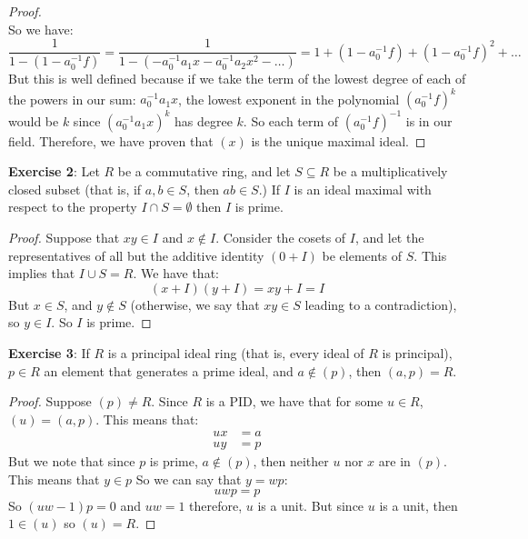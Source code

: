\documentclass{article}
\begin{document}
\begin{proof}
\begin{equation*}
            \end{equation*}
        So we have:
            \begin{equation*}
                \dfrac{1}{1 - (1 - a_{0}^{-1}f)} = \dfrac{1}{1 - (-a_{0}^{-1}a_{1}x - a_{0}^{-1}a_{2}x^{2} - \ldots)} = 1 + (1 - a_{0}^{-1}f) + (1 - a_{0}^{-1}f)^{2} + \ldots
            \end{equation*}
        But this is well defined because if we take the term of the lowest degree of each of the powers in our sum: $a_{0}^{-1}a_{1}x$, the lowest exponent in the polynomial $(a_{0}^{-1}f)^{k}$ would be $k$ since $(a_{0}^{-1}a_{1}x)^{k}$ has degree $k$. So each term of $(a_{0}^{-1}f)^{-1}$ is in our field. Therefore, we have proven that $(x)$ is the unique maximal ideal.
    \end{proof}

\textbf{Exercise 2}: Let $R$ be a commutative ring, and let $S \subseteq R$ be a multiplicatively closed subset (that is, if $a, b \in S$, then $ab \in S$.) If $I$ is an ideal maximal with respect to the property $I \cap S = \emptyset$ then $I$ is prime.
    \begin{proof}
        Suppose that $xy \in I$ and $x \notin I$. Consider the cosets of $I$, and let the representatives of all but the additive identity $(0 + I)$ be elements of $S$. This implies that $I \cup S = R$. We have that:
            \begin{equation*}
                (x + I)(y + I) = xy + I = I
            \end{equation*}
        But $x \in S$, and $y \notin S$ (otherwise, we say that $xy \in S$  leading to a contradiction), so $y \in I$. So $I$ is prime.
    \end{proof}

\textbf{Exercise 3}: If $R$ is a principal ideal ring (that is, every ideal of $R$ is principal), $p \in R$ an element that generates a prime ideal, and $a \notin (p)$, then $(a, p) = R$.
    \begin{proof}
        Suppose $(p) \neq R$. Since $R$ is a PID, we have that for some $u \in R$, $(u) = (a, p)$. This means that:
            \begin{align*}
                ux &= a \\
                uy &= p   
            \end{align*}
        But we note that since $p$ is prime, $a \notin (p)$, then neither $u$ nor $x$ are in $(p)$. This means that $y \in p$ So we can say that $y = wp$:
            \begin{equation*}
                uwp = p
            \end{equation*}
        So $(uw - 1)p = 0$ and $uw = 1$ therefore, $u$ is a unit. But since $u$ is a unit, then $1 \in (u)$ so $(u) = R$.
    \end{proof}
\end{document}
